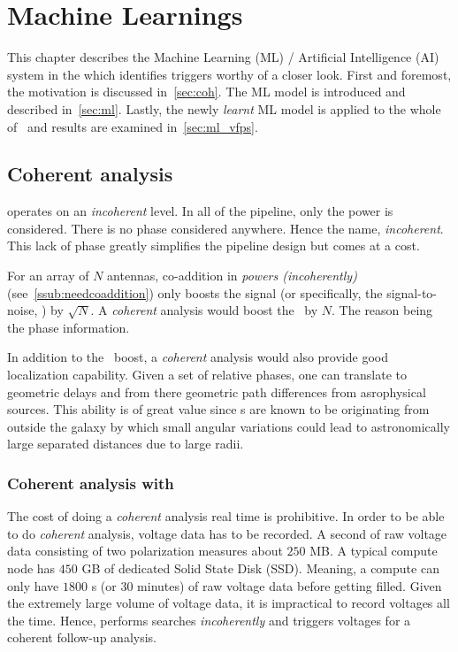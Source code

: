 \chapter{Machine Learnings}
\label{ch:ml}

\par This chapter describes the Machine Learning (ML) / Artificial Intelligence (AI) system in the \vf which identifies triggers worthy of a closer look. First and foremost, the motivation is discussed in~\autoref{sec:coh}.
The ML model is introduced and described in~\autoref{sec:ml}. 
Lastly, the newly \emph{learnt} ML model is applied to the whole of \vfps~and results are examined in~\autoref{sec:ml_vfps}.

\section {Coherent analysis}
\label{sec:coh}

\par \vf operates on an \emph{incoherent} level. In all of the pipeline, only the power is considered.
There is no phase considered anywhere.
Hence the name, \emph{incoherent}.
This lack of phase greatly simplifies the pipeline design but comes at a cost.

\par For an array of $N$ antennas, co-addition in \emph{powers (incoherently)} (see~\autoref{ssub:needcoaddition}) only boosts the signal (or specifically, the signal-to-noise, \sn) by $\sqrt{N}$. 
A \emph{coherent} analysis would boost the \sn~by $N$. The reason being the phase information.

\par In addition to the \sn~boost, a \emph{coherent} analysis would also provide good localization capability.
Given a set of relative phases, one can translate to geometric delays and from there geometric path differences from asrophysical sources.
This ability is of great value since \frb s are known to be originating from outside the galaxy by which small angular variations could lead to astronomically large separated distances due to large radii.

\subsection{Coherent analysis with \vf}

\par The cost of doing a \emph{coherent} analysis real time is prohibitive. 
In order to be able to do \emph{coherent} analysis, voltage data has to be recorded. 
A second of raw voltage data consisting of two polarization measures about $250$ MB. 
A typical \vf compute node has $450$ GB of dedicated Solid State Disk (SSD). Meaning, a \vf compute can only have $1800$ s (or $30$ minutes) of raw voltage data before getting filled.
Given the extremely large volume of voltage data, it is impractical to record voltages all the time.
Hence, \vf performs searches \emph{incoherently} and triggers voltages for a coherent follow-up analysis.

